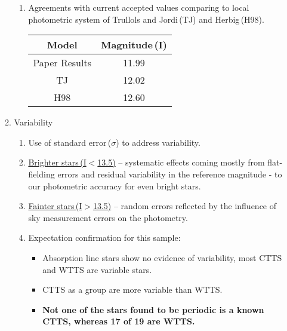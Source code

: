 \documentclass[twocolumn]{aastex6}
\begin{document}
\begin{enumerate}
\begin{enumerate}
\begin{enumerate}
					\item Agreements with current accepted values comparing to local photometric system of Trullols and Jordi\,(TJ) and Herbig\,(H98).
\begin{center}
\begin{tabular}{ c|c }
Model & Magnitude\,(I) \\ \hline
 Paper Results & 11.99  \\ 
 TJ & 12.02  \\  
 H98 & 12.60     
\end{tabular}
\end{center}

				\end{enumerate}
			\item Variability
				\begin{enumerate}
					\item Use of standard error\,($\sigma$) to address variability.
					\item \underline{Brighter stars\,(I$<$13.5)} -- systematic effects coming mostly from flat-fielding errors and residual variability in the reference magnitude - to our photometric accuracy for even bright stars.
					\item \underline{Fainter stars\,(I$>$13.5)} -- random errors reflected by the influence of sky measurement errors on the photometry.
					\item Expectation confirmation for this sample:
						\begin{itemize}
							\item Absorption line stars show no evidence of variability, most CTTS and WTTS are variable stars.
							\item CTTS as a group are more variable than WTTS.
							\item \textbf{Not one of the stars found to be periodic is a known CTTS, whereas 17 of 19 are WTTS.}
						\end{itemize}


\end{enumerate}
\end{enumerate}
\end{enumerate}
\end{document}
